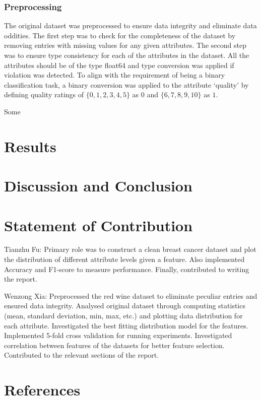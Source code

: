 \documentclass[%
 aip,
 jmp,%
 amsmath,amssymb,
 reprint,%
]{revtex4-1}
\begin{document}
\subsubsection*{Preprocessing}
The original dataset was preprocessed to ensure data integrity and eliminate data oddities. The first step was to check for the completeness of the dataset by removing entries with missing values for any given attributes. The second step was to ensure type consistency for each of the attributes in the dataset. All the attributes should be of the type float64 and type conversion was applied if violation was detected. To align with the requirement of being a binary classification task, a binary conversion was applied to the attribute ‘quality’ by defining quality ratings of $\{0,1,2,3,4,5\}$ as $0$ and $\{6,7,8,9,10\}$ as $1$. 

Some 
\section{\label{sec:level1}Results}


\section{\label{sec:level1}Discussion and Conclusion}

\section{\label{sec:level1}Statement of Contribution}
Tianzhu Fu: Primary role was to construct a clean breast cancer dataset and plot the distribution of different attribute levels given a feature. Also implemented Accuracy and F1-score to measure performance. Finally, contributed to writing the report. \linebreak

Wenzong Xia: Preprocessed the red wine dataset to eliminate peculiar entries and ensured data integrity. Analysed original dataset through computing statistics (mean, standard deviation, min, max, etc.) and plotting data distribution for each attribute. Investigated the best fitting distribution model for the features. Implemented 5-fold cross validation for running experiments. Investigated correlation between features of the datasets for better feature selection. Contributed to the relevant sections of the report.

\section{\label{sec:level1}References}
\end{document}
